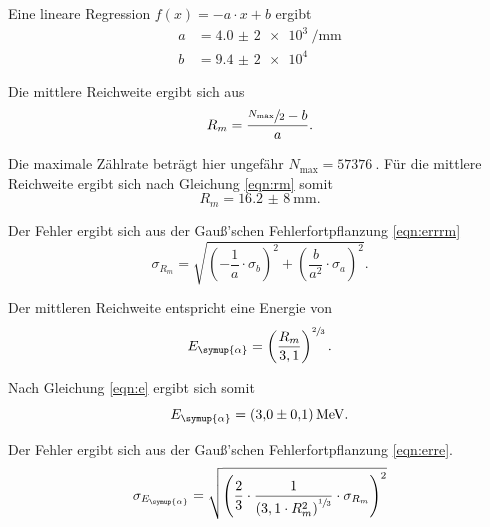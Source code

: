 Eine lineare Regression $f(x) = -a \cdot x + b$ ergibt
\begin{align*}
  a &= \SI{4,0(2)e3}{\per \mm} \\
  b &= \SI{9,4(2)e4}{}
\end{align*}

Die mittlere Reichweite ergibt sich aus
\begin{equation}
  R_m = \frac{\sfrac{N_\text{max}}{2} - b}{a}.
  \label{eqn:rm}
\end{equation}

Die maximale Zählrate beträgt hier ungefähr $N_\text{max} = \SI{57376}{}$. Für die mittlere Reichweite ergibt sich nach Gleichung \eqref{eqn:rm} somit
\begin{equation*}
  R_m = \SI{16,2(8)}{\mm}.
\end{equation*}

Der Fehler ergibt sich aus der Gauß'schen Fehlerfortpflanzung \eqref{eqn:errrm}
\begin{equation}
  \sigma_{R_m} = \sqrt{\left( -\frac{1}{a} \cdot \sigma_b \right)^2 + \left( \frac{b}{a^2} \cdot \sigma_a \right)^2}.
  \label{eqn:errrm}
\end{equation}

Der mittleren Reichweite entspricht eine Energie von
\begin{equation}
  E_{\symup{\alpha}} = \left( \frac{R_m}{3,1} \right)^{\sfrac{2}{3}}.
  \label{eqn:e}
\end{equation}

Nach Gleichung \eqref{eqn:e} ergibt sich somit
\begin{equation*}
  E_{\symup{\alpha}} = \SI{3,0(1)}{\MeV}.
\end{equation*}

Der Fehler ergibt sich aus der Gauß'schen Fehlerfortpflanzung \eqref{eqn:erre}.
\begin{equation}
  \sigma_{E_{\symup{\alpha}}} = \sqrt{\left( \frac{2}{3} \cdot \frac{1}{\left(3,1 \cdot R_m^2 \right)^{\sfrac{1}{3}}} \cdot \sigma_{R_m} \right)^2}
  \label{eqn:erre}
\end{equation}

